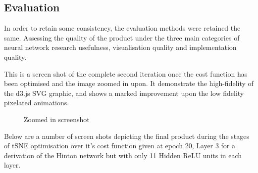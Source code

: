 \documentclass[a4paper,11pt,titlepage]{article}
\begin{document}
	\subsection{Evaluation}
	In order to retain some consistency, the evaluation methods were retained the same. Assessing the quality of the product under the three main categories of neural network research usefulness, visualisation quality and implementation quality.
	\par 
	This is a screen shot of the complete second iteration once the cost function has been optimised and the image zoomed in upon. It demonstrate the high-fidelity of the d3.js SVG graphic, and shows a marked improvement upon the low fidelity pixelated animations.

	\begin{figure}[H]
    			\caption{Zoomed in screenshot}%
	\end{figure}
	
	Below are a number of screen shots depicting the final product during the stages of tSNE optimisation over it's cost function given at epoch 20,  Layer 3 for a derivation of the Hinton network but with only 11 Hidden ReLU units in each layer.
	
		
\end{document}
